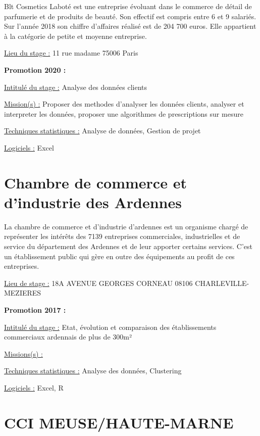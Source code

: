 \documentclass[
  letterpaper,
  DIV=11,
  numbers=noendperiod]{scrreprt}
\begin{document}
Blt Cosmetics Laboté est une entreprise évoluant dans le commerce de
détail de parfumerie et de produits de beauté. Son effectif est compris
entre 6 et 9 salariés. Sur l'année 2018 son chiffre d'affaires réalisé
est de 204 700 euros. Elle appartient à la catégorie de petite et
moyenne entreprise.

\uline{Lieu du stage :} 11 rue madame 75006 Paris

\textbf{Promotion 2020 :}

\uline{Intitulé du stage :} Analyse des données clients

\uline{Mission(s) :} Proposer des methodes d'analyser les données
clients, analyser et interpreter les données, proposer une algorithmes
de prescriptions sur mesure

\uline{Techniques statistiques :} Analyse de données, Gestion de projet

\uline{Logiciels :} Excel

\hypertarget{chambre-de-commerce-et-dindustrie-des-ardennes}{%
\section{\texorpdfstring{\textbf{Chambre de commerce et d'industrie des
Ardennes}}{Chambre de commerce et d'industrie des Ardennes}}\label{chambre-de-commerce-et-dindustrie-des-ardennes}}

La chambre de commerce et d'industrie d'ardennes est un organisme chargé
de représenter les intérêts des 7139 entreprises commerciales,
industrielles et de service du département des Ardennes et de leur
apporter certains services. C'est un établissement public qui gère en
outre des équipements au profit de ces entreprises.

\uline{Lieu de stage :} 18A AVENUE GEORGES CORNEAU 08106
CHARLEVILLE-MEZIERES

\textbf{Promotion 2017 :}

\uline{Intitulé du stage :} Etat, évolution et comparaison des
établissements commerciaux ardennais de plus de 300m²

\uline{Missions(s) :}

\uline{Techniques statistiques :} Analyse des données, Clustering

\uline{Logiciels :} Excel, R

\hypertarget{cci-meusehaute-marne}{%
\section{\texorpdfstring{\textbf{CCI
MEUSE/HAUTE-MARNE}}{CCI MEUSE/HAUTE-MARNE}}\label{cci-meusehaute-marne}}
\end{document}
